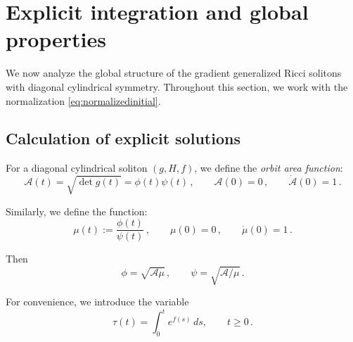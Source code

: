 \documentclass[12pt,a4paper,reqno]{amsart}
\theoremstyle{plain}
\theoremstyle{remark}
\numberwithin{equation}{section}
\newcommand{\cA}{\mathcal{A}}
\begin{document}

\section{Explicit integration and global properties}
\label{sec:gradient generalized Ricci}

We now analyze the global structure of the gradient generalized Ricci solitons with diagonal cylindrical symmetry. Throughout this section, we work with the normalization \eqref{eq:normalizedinitial}.


\subsection{Calculation of explicit solutions}

For a diagonal cylindrical soliton $(g,H,f)$, we define the \emph{orbit area function}:
\begin{equation}\label{eq:areafunction}
\cA(t) = \sqrt{\det g(t)} = \phi(t)\psi(t) \,, \qquad \cA(0) = 0 \,, \qquad \dot{\cA}(0) = 1 \,.
\end{equation}

Similarly, we define the function:
\begin{equation}\label{eq:mu}
\mu(t) := \frac{\phi(t)}{\psi(t)} \,, \qquad \mu(0) = 0 \,, \qquad \dot{\mu}(0) = 1 \,.
\end{equation}

Then 
\begin{equation}\label{eq:phipsimutau}
\phi = \sqrt{\cA\mu} \,, \qquad \psi = \sqrt{\cA/\mu} \,.
\end{equation}

For convenience, we introduce the variable
\begin{equation}\label{eq:tau}
\tau(t) = \int_0^{t}e^{f(s)} \,ds, \qquad t \ge 0 \,.
\end{equation}
\end{document}
